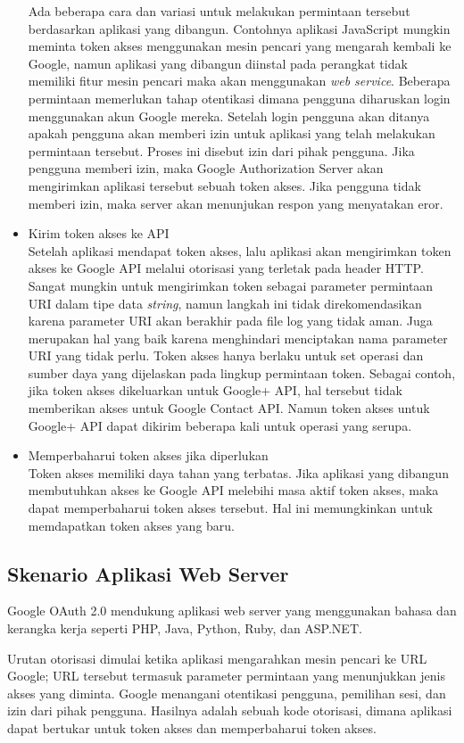 \begin{itemize}
Ada beberapa cara dan variasi untuk melakukan permintaan tersebut berdasarkan aplikasi yang dibangun. Contohnya aplikasi JavaScript mungkin meminta token akses menggunakan mesin pencari yang mengarah kembali ke Google, namun aplikasi yang dibangun diinstal pada perangkat tidak memiliki fitur mesin pencari maka akan menggunakan {\it web service}. Beberapa permintaan memerlukan tahap otentikasi dimana pengguna diharuskan login menggunakan akun Google mereka. Setelah login pengguna akan ditanya apakah pengguna akan memberi izin untuk aplikasi yang telah melakukan permintaan tersebut. Proses ini disebut izin dari pihak pengguna. Jika pengguna memberi izin, maka Google Authorization Server akan mengirimkan aplikasi tersebut sebuah token akses. Jika pengguna tidak memberi izin, maka server akan menunjukan respon yang menyatakan eror.
\item
Kirim token akses ke API\\
Setelah aplikasi mendapat token akses, lalu aplikasi akan mengirimkan token akses ke Google API melalui otorisasi yang terletak pada header HTTP. Sangat mungkin untuk mengirimkan token sebagai parameter permintaan URI dalam tipe data {\it string}, namun langkah ini tidak direkomendasikan karena parameter URI akan berakhir pada file log yang tidak aman. Juga merupakan hal yang baik karena menghindari menciptakan nama parameter URI yang tidak perlu.
Token akses hanya berlaku untuk set operasi dan sumber daya yang dijelaskan pada lingkup permintaan token. Sebagai contoh, jika token akses dikeluarkan untuk Google+ API, hal tersebut tidak memberikan akses untuk Google Contact API. Namun token akses untuk Google+ API dapat dikirim beberapa kali untuk operasi yang serupa.
\item
Memperbaharui token akses jika diperlukan\\
Token akses memiliki daya tahan yang terbatas. Jika aplikasi yang dibangun membutuhkan akses ke Google API melebihi masa aktif token akses, maka dapat memperbaharui token akses tersebut. Hal ini memungkinkan untuk memdapatkan token akses yang baru.
\end{itemize}

\subsection{Skenario Aplikasi Web Server}
Google OAuth 2.0 mendukung aplikasi web server yang menggunakan bahasa dan kerangka kerja seperti PHP, Java, Python, Ruby, dan ASP.NET.

Urutan otorisasi dimulai ketika aplikasi mengarahkan mesin pencari ke URL Google; URL tersebut termasuk parameter permintaan yang menunjukkan jenis akses yang diminta. Google menangani otentikasi pengguna, pemilihan sesi, dan izin dari pihak pengguna. Hasilnya adalah sebuah kode otorisasi, dimana aplikasi dapat bertukar untuk token akses dan memperbaharui token akses.

